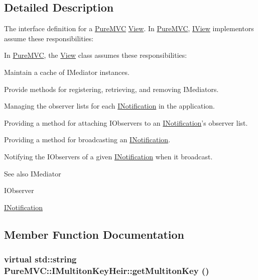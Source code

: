 \subsection{Detailed Description}
The interface definition for a \hyperlink{namespace_pure_m_v_c}{PureMVC} \hyperlink{class_pure_m_v_c_1_1_view}{View}. In \hyperlink{namespace_pure_m_v_c}{PureMVC}, {\ttfamily \hyperlink{class_pure_m_v_c_1_1_i_view}{IView}} implementors assume these responsibilities:

In \hyperlink{namespace_pure_m_v_c}{PureMVC}, the {\ttfamily \hyperlink{class_pure_m_v_c_1_1_view}{View}} class assumes these responsibilities: 
\begin{DoxyItemize}
\item Maintain a cache of {\ttfamily IMediator} instances. 
\item Provide methods for registering, retrieving, and removing {\ttfamily IMediators}. 
\item Managing the observer lists for each {\ttfamily \hyperlink{class_pure_m_v_c_1_1_i_notification}{INotification}} in the application. 
\item Providing a method for attaching {\ttfamily IObservers} to an {\ttfamily \hyperlink{class_pure_m_v_c_1_1_i_notification}{INotification}}'s observer list. 
\item Providing a method for broadcasting an {\ttfamily \hyperlink{class_pure_m_v_c_1_1_i_notification}{INotification}}. 
\item Notifying the {\ttfamily IObservers} of a given {\ttfamily \hyperlink{class_pure_m_v_c_1_1_i_notification}{INotification}} when it broadcast. 
\end{DoxyItemize}

\begin{DoxySeeAlso}{See also}
IMediator 

IObserver 

\hyperlink{class_pure_m_v_c_1_1_i_notification}{INotification} 
\end{DoxySeeAlso}


\subsection{Member Function Documentation}
\hypertarget{class_pure_m_v_c_1_1_i_multiton_key_heir_aecccfb9898368c6377550ceae5730934}{
\subsubsection[{getMultitonKey}]{\setlength{\rightskip}{0pt plus 5cm}virtual std::string PureMVC::IMultitonKeyHeir::getMultitonKey ()}}
\label{class_pure_m_v_c_1_1_i_multiton_key_heir_aecccfb9898368c6377550ceae5730934}


